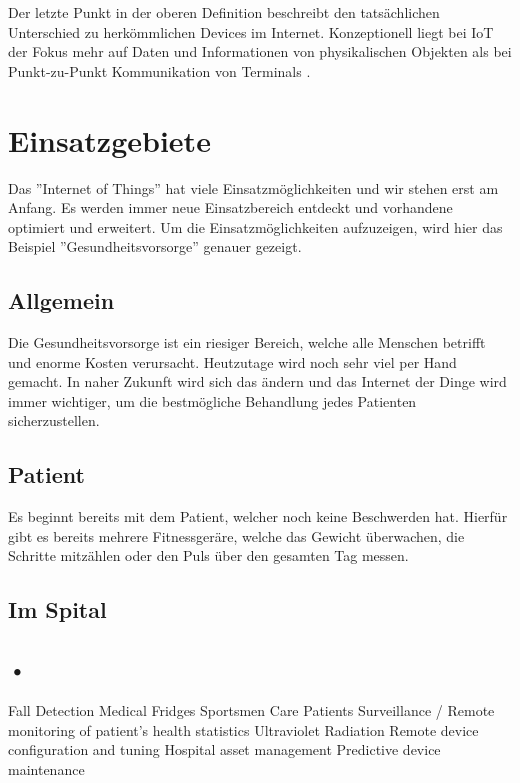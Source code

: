 Der letzte Punkt in der oberen Definition beschreibt den tatsächlichen Unterschied zu herkömmlichen Devices im Internet. Konzeptionell liegt bei IoT der Fokus mehr auf Daten und Informationen von physikalischen Objekten als bei Punkt-zu-Punkt Kommunikation von Terminals \cite{MiorandiSicariPellegriniChlamtac12}.

\section{Einsatzgebiete}
Das ''Internet of Things'' hat viele Einsatzmöglichkeiten und wir stehen erst am Anfang. Es werden immer neue Einsatzbereich entdeckt und vorhandene optimiert und erweitert. Um die Einsatzmöglichkeiten aufzuzeigen, wird hier das Beispiel ''Gesundheitsvorsorge'' genauer gezeigt.
\subsection{Allgemein}
Die Gesundheitsvorsorge ist ein riesiger Bereich, welche alle Menschen betrifft und enorme Kosten verursacht. Heutzutage wird noch sehr viel per Hand gemacht. In naher Zukunft wird sich das ändern und das Internet der Dinge wird immer wichtiger, um die bestmögliche Behandlung jedes Patienten sicherzustellen.
\subsection{Patient}
Es beginnt bereits mit dem Patient, welcher noch keine Beschwerden hat. Hierfür gibt es bereits mehrere Fitnessgeräre, welche das Gewicht überwachen, die Schritte mitzählen oder den Puls über den gesamten Tag messen.
\subsection{Im Spital}
\subsection{•}

Fall Detection
Medical Fridges
Sportsmen Care
Patients Surveillance / Remote monitoring of patient’s health statistics
Ultraviolet Radiation
Remote device configuration and tuning
Hospital asset management
Predictive device maintenance


